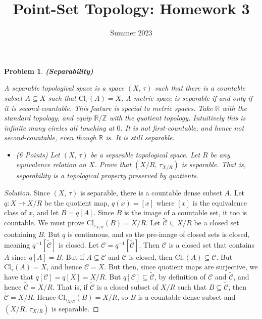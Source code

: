 \documentclass{article}
\title{Point-Set Topology: Homework 3}
\date{Summer 2023}
\theoremstyle{normal}
\newtheorem{problem}{Problem}
\begin{document}
    \maketitle
    \color{blue}
    \begin{problem}
        \textbf{(Separability)}
        \par\hfill\par
        A separable topological space is a space $(X,\,\tau)$ such that there
        is a countable subset $A\subseteq{X}$ such that
        $\textrm{Cl}_{\tau}(A)=X$.
        A metric space is separable if and only if it is second-countable. This
        feature is special to metric spaces. Take $\mathbb{R}$ with the
        standard topology, and equip $\mathbb{R}/\mathbb{Z}$ with the
        quotient topology. Intuitively this is infinite many circles all
        touching at $0$. It is not first-countable, and hence not
        second-countable, even though $\mathbb{R}$ is. It is still separable.
        \begin{itemize}
            \item (6 Points) Let $(X,\,\tau)$ be a separable topological space.
                Let $R$ be any equivalence relation on $X$. Prove that
                $(X/R,\,\tau_{X/R})$ is separable. That is, separability is
                a topological property preserved by quotients.
        \end{itemize}
    \end{problem}
    \color{black}
    \begin{proof}[Solution]
        Since $(X,\,\tau)$ is separable, there is a countable dense subset
        $A$. Let $q:X\rightarrow{X}/R$ be the quotient map, $q(x)=[x]$ where
        $[x]$ is the equivalence class of $x$, and let $B=q[A]$. Since $B$ is
        the image of a countable set, it too is countable. We must prove
        $\textrm{Cl}_{\tau_{X/R}}(B)=X/R$. Let
        $\tilde{\mathcal{C}}\subseteq{X}/R$
        be a closed set containing $B$. But $q$ is continuous, and so the
        pre-image of closed sets is closed, meaning
        $q^{-1}[\tilde{\mathcal{C}}]$ is closed. Let
        $\mathcal{C}=q^{-1}[\tilde{\mathcal{C}}]$. Then $\mathcal{C}$ is a
        closed set that contains $A$ since $q[A]=B$. But if
        $A\subseteq\mathcal{C}$ and $\mathcal{C}$ is closed, then
        $\textrm{Cl}_{\tau}(A)\subseteq\mathcal{C}$. But
        $\textrm{Cl}_{\tau}(A)=X$, and hence $\mathcal{C}=X$. But then, since
        quotient maps are surjective, we have that
        $q[\mathcal{C}]=q[X]=X/R$. But
        $q[\mathcal{C}]\subseteq\tilde{\mathcal{C}}$, by definition of
        $\mathcal{C}$ and $\tilde{\mathcal{C}}$, and hence
        $\tilde{\mathcal{C}}=X/R$. That is, if $\tilde{\mathcal{C}}$ is a
        closed subset of $X/R$ such that $B\subseteq\tilde{\mathcal{C}}$, then
        $\tilde{\mathcal{C}}=X/R$. Hence
        $\textrm{Cl}_{\tau_{X/R}}(B)=X/R$, so $B$ is a countable dense subset
        and $(X/R,\,\tau_{X/R})$ is separable.
    \end{proof}
\end{document}
